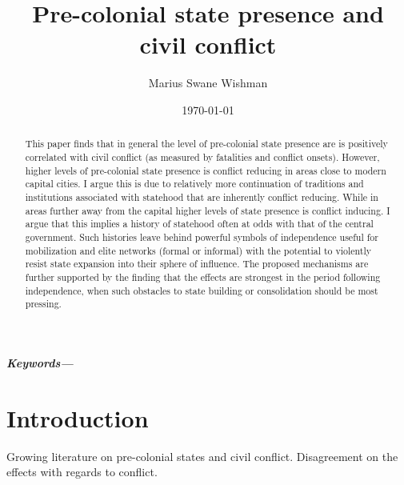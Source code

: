 \documentclass[12pt]{article}
\title{Pre-colonial state presence and civil conflict}
\author[1]{Marius Swane Wishman}
\affil[1]{Department of Sociology and Political Science, NTNU}
\date{\today}
\providecommand{\keywords}[1]
{
	\small	
	\textbf{\textit{Keywords---}} #1
}
\begin{document}
\maketitle

\begin{abstract}

This paper finds that in general the level of pre-colonial state presence are is
positively correlated with civil conflict (as measured by fatalities and
conflict onsets). However, higher levels of pre-colonial state presence is
conflict reducing in areas close to modern capital cities. I argue this is due
to relatively more continuation of traditions and institutions associated with
statehood that are inherently conflict reducing. While in areas further away
from the capital higher levels of state presence is conflict inducing. I argue
that this implies a history of statehood often at odds with that of the central
government. Such histories leave behind powerful symbols of independence useful
for mobilization and elite networks (formal or informal) with the potential to
violently resist state expansion into their sphere of influence. The proposed
mechanisms are further supported by the finding that the effects are strongest
in the period following independence, when such obstacles to state building or
consolidation should be most pressing.

\end{abstract}

\keywords{}


\onehalfspacing


\section{Introduction}

Growing literature on pre-colonial states and civil conflict. Disagreement on
the effects with regards to conflict.
\end{document}
